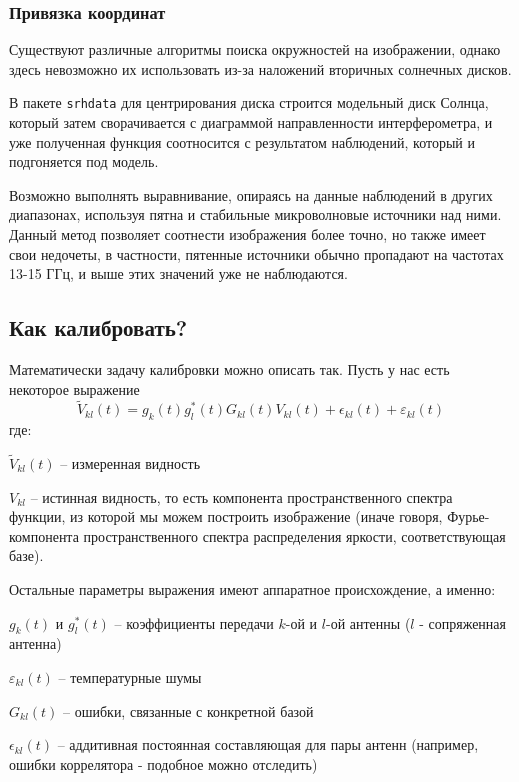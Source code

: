 \subsubsection{Привязка координат}
Существуют различные алгоритмы поиска окружностей на изображении, однако здесь невозможно их использовать из-за наложений вторичных солнечных дисков.

В пакете \texttt{srhdata} для центрирования диска строится модельный диск Солнца, который затем сворачивается с диаграммой направленности интерферометра, и уже полученная функция соотносится с результатом наблюдений, который и подгоняется под модель.

Возможно выполнять выравнивание, опираясь на данные наблюдений в других диапазонах, используя пятна и стабильные микроволновые источники над ними. Данный метод позволяет соотнести изображения более точно, но также имеет свои недочеты, в частности, пятенные источники обычно пропадают на частотах 13-15 ГГц, и выше этих значений уже не наблюдаются.


\subsection{Как калибровать?}
Математически задачу калибровки можно описать так. Пусть у нас есть некоторое выражение
\begin{equation}\label{eq:видности}
	\widetilde{V}_{kl}(t) = g_k(t)g_l^*(t)G_{kl}(t)V_{kl}(t) + \epsilon_{kl}(t) + \varepsilon_{kl}(t)
\end{equation}
где:
\begin{list}{-}{}
	\item $\widetilde{V}_{kl}(t)$ -- измеренная видность
	\item  $V_{kl}$ -- истинная видность, то есть компонента пространственного спектра функции, из которой мы можем построить изображение (иначе говоря, Фурье-компонента пространственного спектра распределения яркости, соответствующая базе).
\end{list}
Остальные параметры выражения имеют аппаратное происхождение, а именно:
\begin{list}{-}{}
	\item $g_k(t)$ и $g_l^*(t)$ -- коэффициенты передачи $k$-ой и $l$-ой антенны ($l$ - сопряженная антенна)
	\item $\varepsilon_{kl}(t)$ -- температурные шумы
	\item $G_{kl}(t)$ -- ошибки, связанные с конкретной базой
	\item $\epsilon_{kl}(t)$ -- аддитивная постоянная составляющая для пары антенн (например, ошибки коррелятора - подобное можно отследить)
\end{list}

